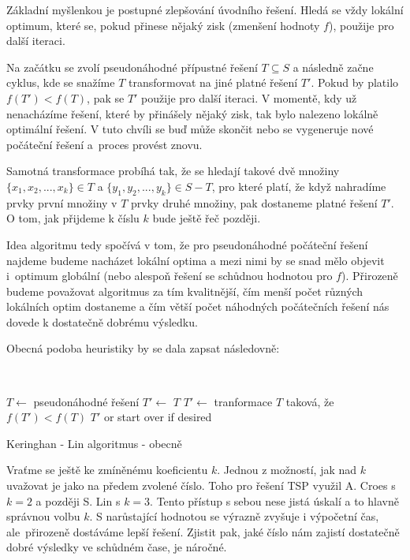 \documentclass[
  biblatex,
  figures=false,
  glossaries,
  index
]{kidiplom}
\begin{document}
Základní myšlenkou je postupné zlepšování úvodního řešení. Hledá se vždy lokální optimum, které se, pokud přinese nějaký zisk (zmenšení hodnoty $f$), použije pro další iteraci.

Na začátku se zvolí pseudonáhodné přípustné řešení $T \subseteq S$ a následně začne cyklus, kde se snažíme $T$ transformovat na jiné platné řešení $T'$. Pokud by platilo $f(T') < f(T)$, pak se $T'$ použije pro další iteraci. V momentě, kdy už nenacházíme řešení, které by přinášely nějaký zisk, tak bylo nalezeno lokálně optimální řešení. V tuto chvíli se buď může skončit nebo se vygeneruje nové počáteční řešení a~proces provést znovu.

\sloppy Samotná transformace probíhá tak, že se hledají takové dvě množiny $\{{x_1, x_2, ..., x_k\} \in T}$ a $\{y_1, y_2, ..., y_k\} \in S - T$, pro které platí, že když nahradíme prvky první množiny v $T$ prvky druhé množiny, pak dostaneme platné řešení $T'$. O tom, jak přijdeme k číslu $k$ bude ještě řeč později.

Idea algoritmu tedy spočívá v tom, že pro pseudonáhodné počáteční řešení najdeme budeme nacházet lokální optima a mezi nimi by se snad mělo objevit i~optimum globální (nebo alespoň řešení se schůdnou hodnotou pro $f$). Přirozeně budeme považovat algoritmus za tím kvalitnější, čím menší počet různých lokálních optim dostaneme a čím větší počet náhodných počátečních řešení nás dovede k dostatečně dobrému výsledku.

Obecná podoba heuristiky by se dala zapsat následovně:\newline


{\LinesNumbered\SetAlgoNoLine\
\begin{algorithm}[H]
$T \leftarrow$ pseudonáhodné řešení\;
$T' \leftarrow$ $T$\;
{
	$T' \leftarrow$ tranformace $T$ taková, že $f(T') < f(T)$\;
}
\Return $T'$ or start over if desired\;
\caption{Keringhan - Lin algoritmus - obecně}
\end{algorithm}
}\leavevmode\newline

Vraťme se ještě ke zmíněnému koeficientu $k$. Jednou z možností, jak nad $k$ uvažovat je jako na předem zvolené číslo. Toho pro řešení TSP využil A. Croes s~$k = 2$ a později S. Lin s $k = 3$. Tento přístup s sebou nese jistá úskalí a to hlavně správnou volbu $k$. S narůstající hodnotou se výrazně zvyšuje i výpočetní čas, ale~přirozeně dostáváme lepší řešení. Zjistit pak, jaké číslo nám zajistí dostatečně dobré výsledky ve schůdném čase, je náročné.
\end{document}
